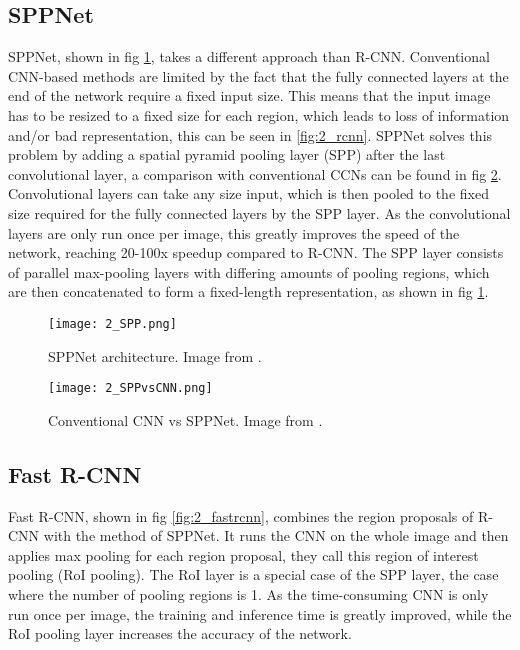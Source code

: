 \subsection{SPPNet \cite{sppnet}}
SPPNet, shown in fig \ref{fig:2_sppnet}, takes a different approach than R-CNN. Conventional CNN-based methods are limited by the fact that the fully connected layers at the end of the network require a fixed input size. This means that the input image has to be resized to a fixed size for each region, which leads to loss of information and/or bad representation, this can be seen in \ref{fig:2_rcnn}. SPPNet solves this problem by adding a spatial pyramid pooling layer (SPP) after the last convolutional layer, a comparison with conventional CCNs can be found in fig \ref{fig:2_sppnetvscnn}. Convolutional layers can take any size input, which is then pooled to the fixed size required for the fully connected layers by the SPP layer. As the convolutional layers are only run once per image, this greatly improves the speed of the network, reaching 20-100x speedup compared to R-CNN. The SPP layer consists of parallel max-pooling layers with differing amounts of pooling regions, which are then concatenated to form a fixed-length representation, as shown in fig \ref{fig:2_sppnet}.

\begin{figure}[H]
	\centering
	\texttt{[image: 2\_SPP.png]}
	\caption{\label{fig:2_sppnet} SPPNet architecture. Image from \citet{sppnet}.}
\end{figure}

\begin{figure}[H]
	\centering
	\texttt{[image: 2\_SPPvsCNN.png]}
	\caption{\label{fig:2_sppnetvscnn} Conventional CNN vs SPPNet. Image from \citet{sppnet}.}
\end{figure}

\subsection{Fast R-CNN \cite{fastrcnn}}
Fast R-CNN, shown in fig \ref{fig:2_fastrcnn}, combines the region proposals of R-CNN with the method of SPPNet. It runs the CNN on the whole image and then applies max pooling for each region proposal, they call this region of interest pooling (RoI pooling). The RoI layer is a special case of the SPP layer, the case where the number of pooling regions is 1. As the time-consuming CNN is only run once per image, the training and inference time is greatly improved, while the RoI pooling layer increases the accuracy of the network.

